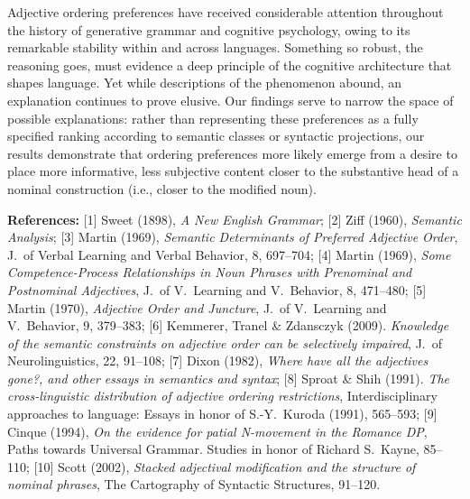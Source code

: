 \documentclass[12pt]{article}
\begin{document}
Adjective ordering preferences have received considerable attention throughout the history of generative grammar and cognitive psychology, owing to its remarkable stability within and across languages. Something so robust, the reasoning goes, must evidence a deep principle of the cognitive architecture that shapes language. Yet while descriptions of the phenomenon abound, an explanation continues to prove elusive. Our findings serve to narrow the space of possible explanations: rather than representing these preferences as a fully specified ranking according to semantic classes or syntactic projections, our results demonstrate that ordering preferences more likely emerge from a desire to place more informative, less subjective content closer to the substantive head of a nominal construction (i.e., closer to the modified noun).

\noindent
\footnotesize
	\textbf{References:} 
	[1]  Sweet (1898), {\em A New English Grammar};
	[2]  Ziff (1960), {\em Semantic Analysis};
	[3]  Martin (1969), {\em Semantic Determinants of Preferred Adjective Order}, J.~of Verbal Learning and Verbal Behavior, 8, 697--704;
	[4]  Martin (1969), {\em Some Competence-Process Relationships in Noun Phrases with Prenominal and Postnominal Adjectives}, J.~of V.~Learning and V.~Behavior, 8, 471--480;
	[5]  Martin (1970), {\em Adjective Order and Juncture}, J.~of V.~Learning and V.~Behavior, 9, 379--383;
	[6] Kemmerer, Tranel \& Zdansczyk (2009). {\em Knowledge of the semantic constraints on adjective order can be selectively impaired}, J.~of Neurolinguistics, 22, 91--108;
	[7]  Dixon (1982), {\em Where have all the adjectives gone?, and other essays in semantics and syntax};
	[8]  Sproat \& Shih (1991). {\em The cross-linguistic distribution of adjective ordering restrictions}, Interdisciplinary approaches to language: Essays in honor of S.-Y.~Kuroda (1991), 565--593;
	[9]  Cinque (1994), {\em On the evidence for patial N-movement in the Romance DP}, Paths towards Universal Grammar. Studies in honor of Richard S.~Kayne, 85--110;
	[10]  Scott (2002), {\em Stacked adjectival modification and the structure of nominal phrases}, The Cartography of Syntactic Structures, 91--120.

	
\newpage
\end{document}
